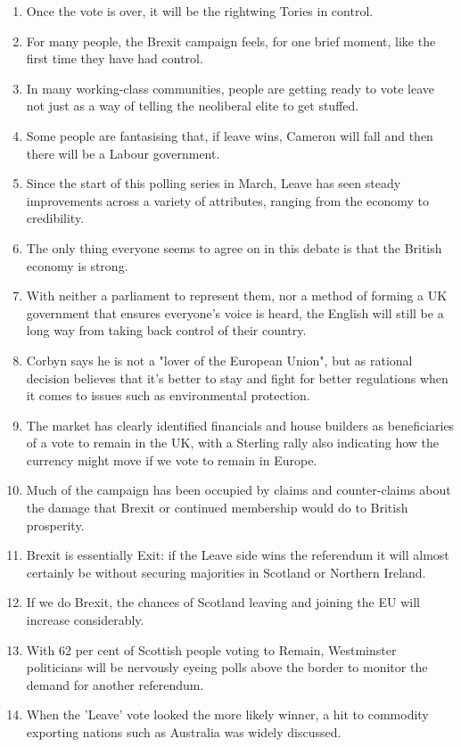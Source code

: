 \documentclass[fleqn,moreauthors,10pt]{ds_report}
\begin{document}
\begin{enumerate}
    \item Once the vote is over, it will be the rightwing Tories in control.
    \item For many people, the Brexit campaign feels, for one brief moment, like the first time they have had control.
    \item In many working-class communities, people are getting ready to vote leave not just as a way of telling the neoliberal elite to get stuffed.
    \item Some people are fantasising that, if leave wins, Cameron will fall and then there will be a Labour government.
    \item Since the start of this polling series in March, Leave has seen steady improvements across a variety of attributes, ranging from the economy to credibility.
    \item The only thing everyone seems to agree on in this debate is that the British economy is strong.
    \item With neither a parliament to represent them, nor a method of forming a UK government that ensures everyone's voice is heard, the English will still be a long way from taking back control of their country.
    \item Corbyn says he is not a "lover of the European Union", but as rational decision believes that it's better to stay and fight for better regulations when it comes to issues such as environmental protection.
    \item The market has clearly identified financials and house builders as beneficiaries of a vote to remain in the UK, with a Sterling rally also indicating how the currency might move if we vote to remain in Europe.
    \item Much of the campaign has been occupied by claims and counter-claims about the damage that Brexit or continued membership would do to British prosperity.
    \item Brexit is essentially Exit: if the Leave side wins the referendum it will almost certainly be without securing majorities in Scotland or Northern Ireland.
    \item If we do Brexit, the chances of Scotland leaving and joining the EU will increase considerably.
    \item With 62 per cent of Scottish people voting to Remain, Westminster politicians will be nervously eyeing polls above the border to monitor the demand for another referendum.
    \item When the 'Leave' vote looked the more likely winner, a hit to commodity exporting nations such as Australia was widely discussed.

\end{enumerate}
\end{document}
